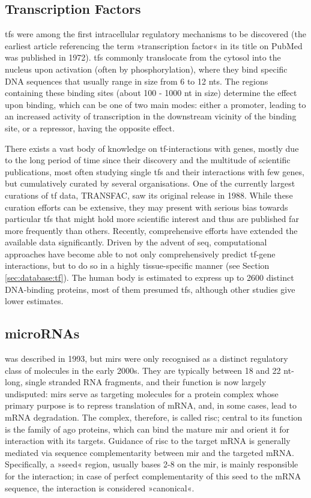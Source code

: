 \subsection{Transcription Factors} \label{sec:intro:tf}
\Acfp{tf} were among the first intracellular regulatory mechanisms to be discovered (the earliest article referencing the term »transcription factor« in its title on PubMed was published in 1972). \acp{tf} commonly translocate from the cytosol into the nucleus upon activation (often by phosphorylation), where they bind specific DNA sequences that usually range in size from 6 to 12 \acp{nt}. The regions containing these binding sites (about 100 - 1000 \ac{nt} in size) determine the effect upon binding, which can be one of two main modes: either a promoter, leading to an increased activity of transcription in the downstream vicinity of the binding site, or a repressor, having the opposite effect. 

There exists a vast body of knowledge on \ac{tf}-interactions with genes, mostly due to the long period of time since their discovery and the multitude of scientific publications, most often studying single \acp{tf} and their interactions with few genes, but cumulatively curated by several organisations. One of the currently largest curations of \ac{tf} data, TRANSFAC, saw its original release in 1988. While these curation efforts can be extensive, they may present with serious bias towards particular \acp{tf} that might hold more scientific interest and thus are published far more frequently than others. Recently, comprehensive efforts have extended the available data significantly. Driven by the advent of \ac{seq}, computational approaches have become able to not only comprehensively predict \ac{tf}-gene interactions, but to do so in a highly tissue-specific manner (see Section \ref{sec:database:tf}). The human body is estimated to express up to 2600 distinct DNA-binding proteins, most of them presumed \acp{tf},\cite{Babu2004} although other studies give lower estimates. 

\subsection{microRNAs} \label{sec:intro:mirna}
 was described in 1993,\cite{Lee1993} but \acfp{mir} were only recognised as a distinct regulatory class of molecules in the early 2000s. They are typically between 18 and 22 \ac{nt}-long, single stranded RNA fragments, and their function is now largely undisputed: \acp{mir} serve as targeting molecules for a protein complex whose primary purpose is to repress translation of mRNA, and, in some cases, lead to mRNA degradation. The complex, therefore, is called \ac{risc}; central to its function is the family of \ac{ago} proteins, which can bind the mature \ac{mir} and orient it for interaction with its targets. Guidance of \ac{risc} to the target mRNA is generally mediated via sequence complementarity between \ac{mir} and the targeted mRNA. Specifically, a »seed« region, usually bases 2-8 on the \ac{mir}, is mainly responsible for the interaction; in case of perfect complementarity of this seed to the mRNA sequence, the interaction is considered »canonical«.

